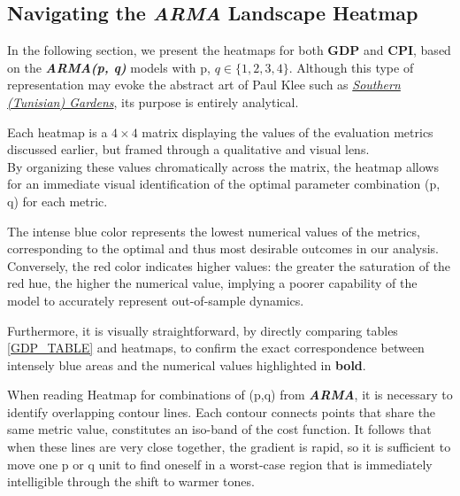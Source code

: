 \documentclass{Configuration_Files/PoliMi3i_thesis}
\begin{document}
\subsection{Navigating the \textbf{\textit{ARMA}} Landscape Heatmap}
In the following section, we present the heatmaps for both \textbf{GDP} and \textbf{CPI}, based on the \textbf{\textit{ARMA(p, q)}} models with p,  \(q \in \{1, 2, 3, 4\}\).
Although this type of representation may evoke the abstract art of Paul Klee such as \href{https://www.wikiart.org/en/paul-klee/southern-tunisian-gardens-1919}{\textit{Southern (Tunisian) Gardens}}, its purpose is entirely analytical.

Each heatmap is a \(4 \times 4\) matrix displaying the values of the evaluation metrics discussed earlier, but framed through a qualitative and visual lens.\\
By organizing these values chromatically across the matrix, the heatmap allows for an immediate visual identification of the optimal parameter combination (p, q) for each metric.

The intense blue color represents the lowest numerical values of the metrics, corresponding to the optimal and thus most desirable outcomes in our analysis. Conversely, the red color indicates higher values: the greater the saturation of the red hue, the higher the numerical value, implying a poorer capability of the model to accurately represent out-of-sample dynamics.

Furthermore, it is visually straightforward, by directly comparing tables \ref{GDP_TABLE} and heatmaps, to confirm the exact correspondence between intensely blue areas and the numerical values highlighted in \textbf{bold}.

When reading Heatmap for combinations of (p,q) from \textbf{\textit{ARMA}}, it is necessary to identify overlapping contour lines. Each contour connects points that share the same metric value, constitutes an iso-band of the cost function. It follows that when these lines are very close together, the gradient is rapid, so it is sufficient to move one p or q unit to find oneself in a worst-case region that is immediately intelligible through the shift to warmer tones.
\end{document}
